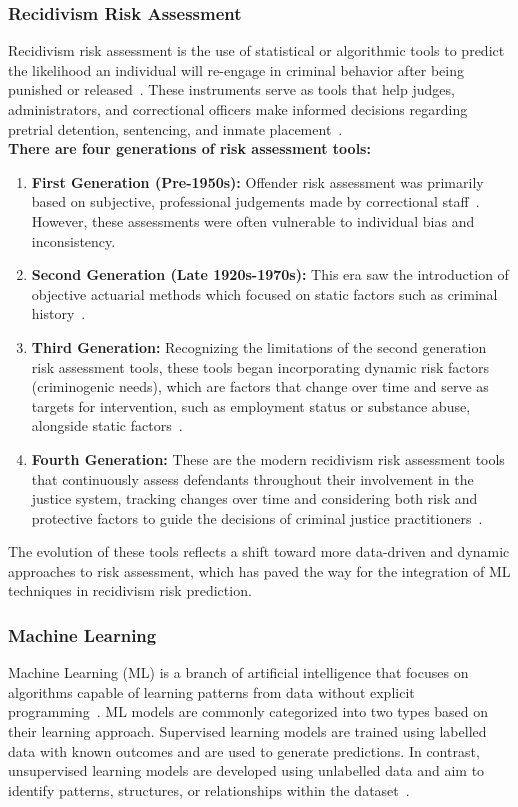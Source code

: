 \documentclass[12pt]{article}
\begin{document}
\subsubsection{Recidivism Risk Assessment} 
\tab Recidivism risk assessment is the use of statistical or algorithmic tools to predict the likelihood an individual will re-engage in criminal behavior after being punished or released~\cite{ozkan2017predicting}. These instruments serve as tools that help judges, administrators, and correctional officers make informed decisions regarding pretrial detention, sentencing, and inmate placement~\cite{corbett2017algorithmic}.\\

\textbf{There are four generations of risk assessment tools:}
\begin{enumerate}
  \item \textbf{First Generation (Pre-1950s):} Offender risk assessment was primarily based on subjective, professional judgements made by correctional staff~\cite{duwe2017out,ozkan2017predicting}. However, these assessments were often vulnerable to individual bias and inconsistency.
  \item \textbf{Second Generation (Late 1920s-1970s):} This era saw the introduction of objective actuarial methods which focused on static factors such as criminal history~\cite{duwe2017out}. 
  \item \textbf{Third Generation:} Recognizing the limitations of the second generation risk assessment tools, these tools began incorporating dynamic risk factors (criminogenic needs), which are factors that change over time and  serve as targets for intervention, such as employment status or substance abuse, alongside static factors~\cite{duwe2017out}. 
  \item \textbf{Fourth Generation:} These are the modern recidivism risk assessment tools that continuously assess defendants throughout their involvement in the justice system, tracking changes over time and considering both risk and protective factors to guide the decisions of criminal justice practitioners~\cite{duwe2017out}.
\end{enumerate}

The evolution of these tools reflects a shift toward more data-driven and dynamic approaches to risk assessment, which has paved the way for the integration of ML techniques in recidivism risk prediction.

\subsubsection{Machine Learning}
\tab Machine Learning (ML) is a branch of artificial intelligence that focuses on algorithms capable of learning patterns from data without explicit programming~\cite{duwe2017out}. ML models are commonly categorized into two types based on their learning approach. Supervised learning models are trained using labelled data with known outcomes and are used to generate predictions. In contrast, unsupervised learning models are developed using unlabelled data and aim to identify patterns, structures, or relationships within the dataset~\cite{badillo2020introduction}.\\
\end{document}
